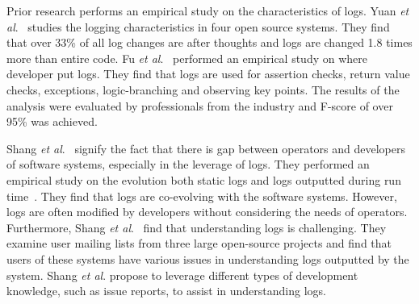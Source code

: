 
Prior research performs an empirical study on the characteristics of logs. Yuan \textsl{et al}$ . $~\cite{Characterizinglogs} studies the logging characteristics in four open source systems. They find that over 33\% of all log changes are after thoughts and logs are changed 1.8 times more than entire code. Fu \textsl{et al$.$}~\cite{Fu1} performed an empirical study on where developer put logs. They find that logs are used for assertion checks, return value checks, exceptions, logic-branching and observing key points. The results of the analysis were evaluated by professionals from the industry and F-score of over 95\% was achieved. 


Shang \textsl{et al$ . $}~\cite{IanGap} signify the fact that there is gap between operators and developers of software systems, especially in the leverage of logs. They performed an empirical study on the evolution both static logs and logs outputted during run time~\cite{EMSEIAN,PaperIanCIIII}. They find that logs are co-evolving with the software systems. However, logs are often modified by developers without considering the needs of operators. Furthermore, Shang\textsl{ et al$ . $}~\cite{IanIcesm} find that understanding logs is challenging. They examine user mailing lists from three large open-source projects and find that users of these systems have various issues in understanding logs outputted by the system. Shang\textsl{ et al$ . $} propose to leverage different types of development knowledge, such as issue reports, to assist in understanding logs. 

